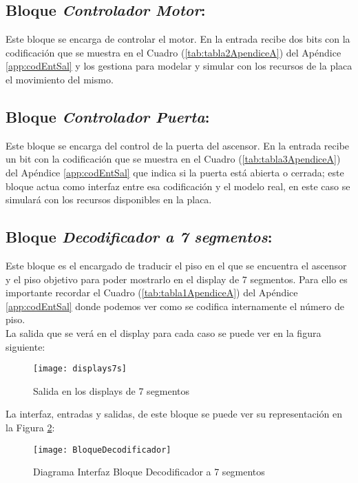 \subsection{Bloque \textit{Controlador Motor}:}
    Este bloque se encarga de controlar el motor. En la entrada recibe dos bits con la codificación que se muestra en el Cuadro (\ref{tab:tabla2ApendiceA}) del Apéndice \ref{app:codEntSal} y los gestiona para modelar y simular con los recursos de la placa el movimiento del mismo.
    
\subsection{Bloque \textit{Controlador Puerta}:}
    Este bloque se encarga del control de la puerta del ascensor. En la entrada recibe un bit con la codificación que se muestra en el Cuadro (\ref{tab:tabla3ApendiceA}) del Apéndice \ref{app:codEntSal} que indica si la puerta está abierta o cerrada; este bloque actua como interfaz entre esa codificación y el modelo real, en este caso se simulará con los recursos disponibles en la placa.

\subsection{Bloque \textit{Decodificador a 7 segmentos}:}
    Este bloque es el encargado de traducir el piso en el que se encuentra el ascensor y el piso objetivo para poder mostrarlo en el display de 7 segmentos. Para ello es importante recordar el Cuadro (\ref{tab:tabla1ApendiceA}) del Apéndice \ref{app:codEntSal} donde podemos ver como se codifica internamente el número de piso. \\ 
    
    La salida que se verá en el display para cada caso se puede ver en la figura siguiente:
    
    \begin{figure}[H]
		    \centering
		    \texttt{[image: displays7s]}
		    \caption{Salida en los displays de 7 segmentos}
		    \label{fig:displays7s}
	\end{figure}
    
    La interfaz, entradas y salidas, de este bloque se puede ver su representación en la Figura \ref{fig:BloqueDecodificador7seg}:
    
    \begin{figure}[H]
		    \centering
		    \texttt{[image: BloqueDecodificador]}
		    \caption{Diagrama Interfaz Bloque Decodificador a 7 segmentos}
		    \label{fig:BloqueDecodificador7seg}
	\end{figure}
